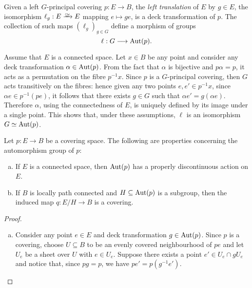 \begin{example}[Translations]
    \label{exp:left-translation-is-deck-transformation}
    Given a left \(G\)-principal covering \(p: E \to B\), the \emph{left
        translation} of \(E\) by \(g \in E\), the isomorphism \(\ell_g: E \isoto E\)
    mapping \(e \mapsto g e\), is a deck transformation of \(p\). The collection of
    such maps \((\ell_g)_{g \in G}\) define a morphism of groups
    \[
        \ell: G \longrightarrow \operatorname{Aut}(p).
    \]

    Assume that \(E\) is a connected space. Let \(x \in B\) be any point and
    consider any deck transformation \(\alpha \in \operatorname{Aut}(p)\). From the fact that
    \(\alpha\) is bijective and \(p \alpha = p\), it acts as a permutation on the
    fibre \(p^{-1} x\). Since \(p\) is a \(G\)-principal covering, then \(G\) acts
    transitively on the fibres: hence given any two points \(e, e' \in p^{-1} x\),
    since \(\alpha e \in p^{-1}(p e)\), it follows that there exists \(g \in G\)
    such that \(\alpha e' = g(\alpha e)\). Therefore \(\alpha\), using the
    connectedness of \(E\), is uniquely defined by its image under a single
    point. This shows that, under these assumptions, \(\ell\) is an isomorphism
    \(G \simeq \operatorname{Aut}(p)\).
\end{example}

\begin{proposition}
    \label{prop:automorphism-grp-covering-properties}
    Let \(p: E \to B\) be a covering space. The following are properties concerning
    the automorphism group of \(p\):
    \begin{enumerate}[(a)]\setlength\itemsep{0em}
        \item If \(E\) is a connected space, then \(\operatorname{Aut}(p)\) has a properly
              discontinuous action on \(E\).

        \item If \(B\) is locally path connected and \(H \subseteq \operatorname{Aut}(p)\) is a
              subgroup, then the induced map \(q: E/H \to B\) is a covering.
    \end{enumerate}
\end{proposition}

\begin{proof}
    \begin{enumerate}[(a)]\setlength\itemsep{0em}
        \item Consider any point \(e \in E\) and deck transformation \(g \in
              \operatorname{Aut}(p)\). Since \(p\) is a covering, choose \(U \subseteq B\) to be an evenly
              covered neighbourhood of \(p e\) and let \(U_e\) be a sheet over \(U\) with
              \(e \in U_e\). Suppose there exists a point \(e' \in U_e \cap g U_e\) and
              notice that, since \(p g = p\), we have \(p e' = p(g^{-1} e')\).

    \end{enumerate}
\end{proof}

